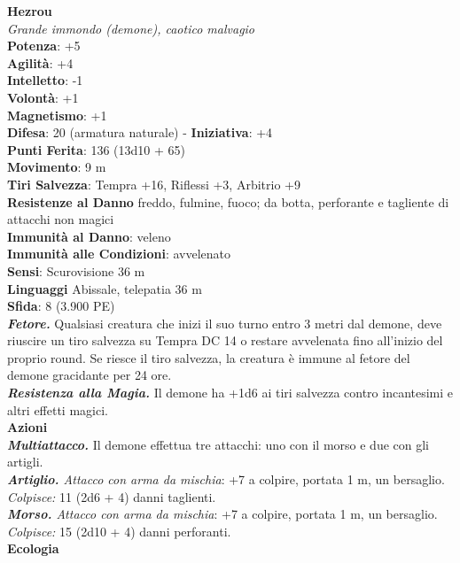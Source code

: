 \begin{multicols}{2}
\medskip\textbf{Hezrou}\\
\emph{Grande immondo (demone), caotico malvagio}\\
\textbf{Potenza}: +5\\
\textbf{Agilità}: +4\\
\textbf{Intelletto}: -1\\
\textbf{Volontà}: +1\\
\textbf{Magnetismo}: +1\\
\textbf{Difesa}: 20 (armatura naturale) - \textbf{Iniziativa}: +4\\
\textbf{Punti Ferita}: 136 (13d10 + 65)\\
\textbf{Movimento}: 9 m\\
\textbf{Tiri Salvezza}: Tempra +16, Riflessi +3, Arbitrio +9\\
\textbf{Resistenze al Danno} freddo, fulmine, fuoco; da botta, perforante e tagliente di attacchi non magici\\
\textbf{Immunità al Danno}: veleno\\
\textbf{Immunità alle Condizioni}: avvelenato\\
\textbf{Sensi}: Scurovisione 36 m\\
\textbf{Linguaggi} Abissale, telepatia 36 m \\
\textbf{Sfida}: 8 (3.900 PE)\smallskip\\
\emph{\textbf{Fetore.}} Qualsiasi creatura che inizi il suo turno entro 3 metri dal demone, deve riuscire un tiro salvezza su Tempra DC 14 o restare avvelenata fino all'inizio del proprio round. Se riesce il tiro salvezza, la creatura è immune al fetore del demone gracidante per 24 ore.\\
\emph{\textbf{Resistenza alla Magia.}} Il demone ha +1d6 ai tiri salvezza contro incantesimi e altri effetti magici.\\
\smallskip\textbf{Azioni}\\
\emph{\textbf{Multiattacco.}} Il demone effettua tre attacchi: uno con il morso e due con gli artigli.\\
\emph{\textbf{Artiglio.} Attacco con arma da mischia}: +7 a colpire, portata 1 m, un bersaglio.\\
\emph{Colpisce:} 11 (2d6 + 4) danni taglienti. \\
\emph{\textbf{Morso.} Attacco con arma da mischia}: +7 a colpire, portata 1 m, un bersaglio.\\
\emph{Colpisce:} 15 (2d10 + 4) danni perforanti.\\
\textbf{Ecologia}\\

\end{multicols}
